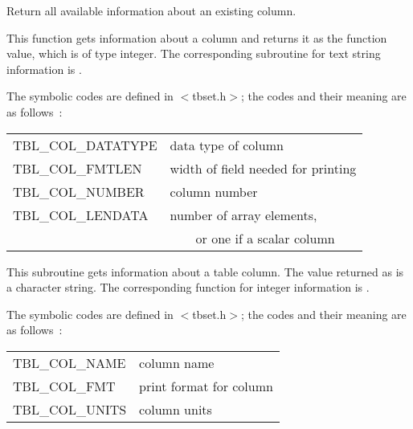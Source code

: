Return all available information about an existing column.

\callseqtable

\begin{callseq}
\end{callseq}

This function gets information about a column
and returns it as the function value, which is of type integer.
The corresponding subroutine for text string information is .

\callseqfcn

The symbolic codes are defined in $<$tbset.h$>$;
the codes and their meaning are as follows~:
\begin{center}
\begin{tabular}{ll}
TBL\_COL\_DATATYPE & data type of column \\
TBL\_COL\_FMTLEN   & width of field needed for printing \\
TBL\_COL\_NUMBER   & column number \\
TBL\_COL\_LENDATA  & number of array elements, \\
                 & ~~~~or one if a scalar column \\
\end{tabular}
\end{center}

\begin{callseq}
\end{callseq}

This subroutine gets information about a table column.
The value returned as  is a character string.
The corresponding function for integer information is .

\callseqtable

The symbolic codes are defined in $<$tbset.h$>$;
the codes and their meaning are as follows~:
\begin{center}
\begin{tabular}{ll}
TBL\_COL\_NAME  & column name \\
TBL\_COL\_FMT   & print format for column \\
TBL\_COL\_UNITS & column units \\
\end{tabular}
\end{center}

